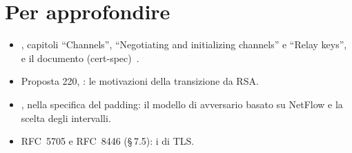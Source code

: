 \section*{Per approfondire}
\begin{itemize}
  \item {}, capitoli \enquote{Channels}, \enquote{Negotiating and initializing channels} e \enquote{Relay keys}, e il documento  (cert-spec)~\cite{torspec}.
  \item Proposta 220, : le motivazioni della transizione da RSA.
  \item {}, nella specifica del padding: il modello di avversario basato su NetFlow e la scelta degli intervalli.
  \item RFC~5705 e RFC~8446 (§\,7.5): i  di TLS.
\end{itemize}
